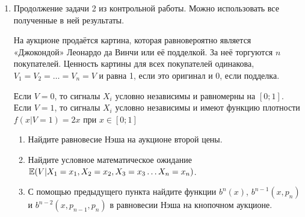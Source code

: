 \begin{enumerate}



\item Продолжение задачи 2 из контрольной работы. Можно использовать все полученные в ней результаты.

На аукционе продаётся картина, которая равновероятно является «Джокондой» Леонардо да Винчи или её подделкой. За неё торгуются $ n $ покупателей. Ценность картины для всех покупателей одинакова, $ V_{1}=V_{2}=\ldots =V_{n}=V $ и равна 1, если это оригинал и 0, если подделка.

Если $ V=0 $, то сигналы $ X_{i} $ условно независимы и равномерны на $ [0;1] $. Если $ V=1 $, то сигналы $ X_{i} $ условно независимы и имеют функцию плотности $ f(x|V=1)=2x $ при  $x\in [0;1] $

\begin{enumerate}
\item Найдите равновесие Нэша на аукционе второй цены.
\item Найдите условное математическое ожидание $ \operatorname{\mathbb{E}}(V|X_{1}=x_{1},X_{2}=x_{2},X_{3}=x_{3}\ldots X_{n}=x_{n}) $.
\item С помощью предыдущего пункта найдите функции $ b^{n}(x) $,  $ b^{n-1}(x,p_{n}) $  и $ b^{n-2}(x,p_{n-1},p_{n}) $ в равновесии Нэша на кнопочном аукционе.
\end{enumerate}





\end{enumerate}
